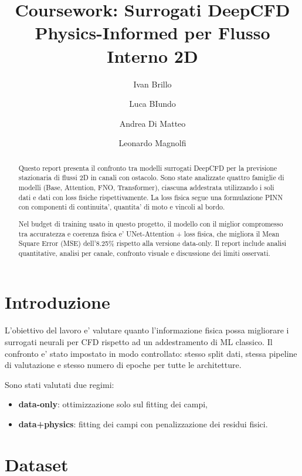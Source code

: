 \documentclass[final,3p,times]{elsarticle}
\begin{document}
\begin{frontmatter}

\title{Coursework: Surrogati DeepCFD Physics-Informed per Flusso Interno 2D}

\author{Ivan Brillo}
\author{Luca BIundo}
\author{Andrea Di Matteo}
\author{Leonardo Magnolfi}


\begin{abstract}
Questo report presenta il confronto tra modelli surrogati DeepCFD per la previsione stazionaria di flussi 2D in canali con ostacolo. Sono state analizzate quattro famiglie di modelli (Base, Attention, FNO, Transformer), ciascuna addestrata utilizzando i soli dati e dati con loss fisiche rispettivamente. La loss fisica segue una formulazione PINN con componenti di continuita', quantita' di moto e vincoli al bordo.

Nel budget di training usato in questo progetto, il modello con il miglior compromesso tra accuratezza e coerenza fisica e' UNet-Attention + loss fisica, che migliora il Mean Square Error (MSE) dell'8.25\% rispetto alla versione data-only. Il report include analisi quantitative, analisi per canale, confronto visuale e discussione dei limiti osservati.
\end{abstract}

\end{frontmatter}

\section{Introduzione}
L'obiettivo del lavoro e' valutare quanto l'informazione fisica possa migliorare i surrogati neurali per CFD rispetto ad un addestramento di ML classico. Il confronto e' stato impostato in modo controllato: stesso split dati, stessa pipeline di valutazione e stesso numero di epoche per tutte le architetture.

Sono stati valutati due regimi:
\begin{itemize}
    \item \textbf{data-only}: ottimizzazione solo sul fitting dei campi,
    \item \textbf{data+physics}: fitting dei campi con penalizzazione dei residui fisici.
\end{itemize}

\section{Dataset}
\end{document}
